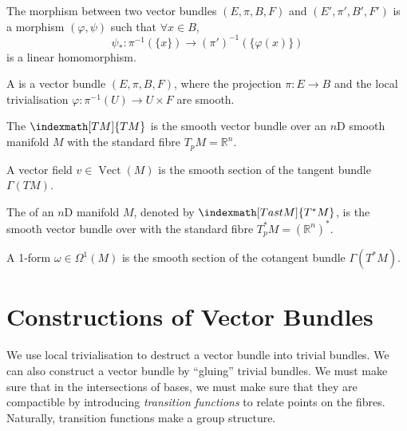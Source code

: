 \documentclass[openany, oneside, a5paper]{book}
\DeclareMathOperator{\Vect}{Vect}
\begin{document}
\begin{definition}
    The morphism between two vector bundles $(E, \pi, B, F)$ and $(E', \pi', B', F')$ is a morphism $(\varphi, \psi)$ such that $\forall x \in B$, 
    \begin{equation}
        \psi_* \colon \pi^{-1}(\{x\}) \to (\pi')^{-1}(\{\varphi(x)\})
    \end{equation}
    is a linear homomorphism.
\end{definition}

\begin{definition}
    A  is a vector bundle $(E, \pi, B, F)$, where the projection $\pi \colon E \to B$ and the local trivialisation $\varphi \colon \pi^{-1}(U) \to U \times F$ are smooth.
\end{definition}

\begin{definition}
    The  $\indexmath[TM]{{TM}}$ is the smooth vector bundle over an $n$D smooth manifold $M$ with the standard fibre $T_p M = \mathbb R^n$.
\end{definition}

A vector field $v \in \Vect(M)$ is the smooth section of the tangent bundle $\Gamma(TM)$.

\begin{definition}
    The  of an $n$D manifold $M$, 
    denoted by $\indexmath[T ast M]{{T^*M}}$, 
    is the smooth vector bundle over with the standard fibre $T^*_p M = (\mathbb R^n)^*$.
\end{definition}

A 1-form $\omega \in \Omega^1(M)$ is the smooth section of the cotangent bundle $\Gamma(T^*M)$.

\section{Constructions of Vector Bundles}

We use local trivialisation to destruct a vector bundle into trivial bundles.
We can also construct a vector bundle by ``gluing'' trivial bundles.
We must make sure that in the intersections of bases, we must make sure that they are compactible by introducing \emph{transition functions} to relate points on the fibres.
Naturally, transition functions make a group structure.
\end{document}
